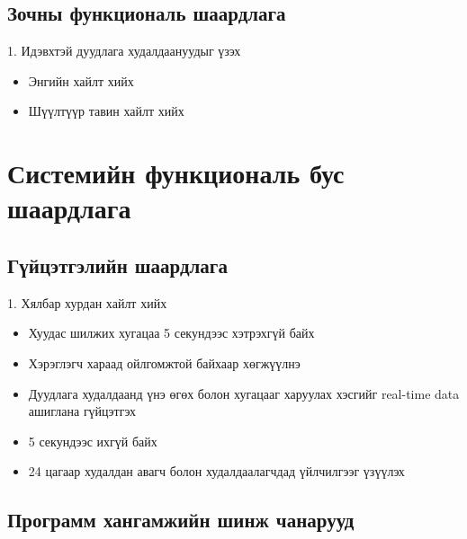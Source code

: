     \subsection{Зочны функциональ шаардлага}
    1. Идэвхтэй дуудлага худалдаануудыг үзэх
     \begin{itemize}
    \item Энгийн хайлт хийх
    \item Шүүлтүүр тавин хайлт хийх
\end{itemize}

\newpage
 \section{Системийн функциональ бус шаардлага}
    \subsection{Гүйцэтгэлийн шаардлага}
    1. Хялбар хурдан хайлт хийх
    \begin{itemize}
    \item Хуудас шилжих хугацаа 5 секундээс хэтрэхгүй байх
\end{itemize}
    \begin{itemize}
    \item Хэрэглэгч хараад ойлгомжтой байхаар хөгжүүлнэ
    \item Дуудлага худалдаанд үнэ өгөх болон хугацааг харуулах хэсгийг real-time data ашиглана гүйцэтгэх
\end{itemize}
    \begin{itemize}
    \item 5 секундээс ихгүй байх
\end{itemize}
    \begin{itemize}
    \item 24 цагаар худалдан авагч болон худалдаалагчдад үйлчилгээг үзүүлэх
\end{itemize}
    \subsection{ Программ хангамжийн шинж чанарууд}
  
